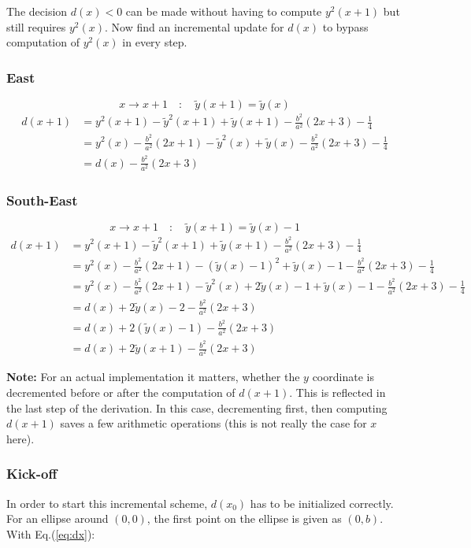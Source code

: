 \documentclass[12pt]{scrartcl}
\def\tyx{\widetilde{y}(x)}
\def\tyxp{\widetilde{y}(x+1)}
\def\yxs{y^2(x)}
\def\yxps{y^2(x+1)}
\def\tyxs{\widetilde{y}^2(x)}
\def\tyxps{\widetilde{y}^2(x+1)}
\def\fba{\frac{b^2}{a^2}}
\def\dx{d(x)}
\def\dxp{d(x+1)}
\def\fof{\frac{1}{4}}
\begin{document}
The decision $ \dx < 0 $ can be made without having to compute $\yxps$ 
but still requires $\yxs$. Now find an incremental update for $\dx$ to 
bypass computation of $\yxs$ in every step.

\subsubsection*{East}

$$ x \rightarrow x+1 \quad:\quad \tyxp = \tyx $$
\begin{align}
\dxp &= \yxps - \tyxps + \tyxp - \fba(2x+3) - \fof \nonumber \\
     &= \yxs - \fba(2x+1) - \tyxs + \tyx - \fba(2x+3) - \fof \nonumber \\
     &= \dx - \fba(2x+3)
\label{eq:dxe}
\end{align}

\subsubsection*{South-East}

$$ x \rightarrow x+1 \quad:\quad \tyxp = \tyx-1 $$
\begin{align}
\dxp &= \yxps - \tyxps + \tyxp - \fba(2x+3) - \fof \nonumber \\
     &= \yxs - \fba(2x+1) - (\tyx-1)^2 + \tyx - 1 - \fba(2x+3) - \fof \nonumber \\
     &= \yxs - \fba(2x+1) - \tyxs + 2\tyx - 1 + \tyx - 1 - \fba(2x+3) - \fof \nonumber \\
     &= \dx + 2\tyx - 2 - \fba(2x+3) \nonumber \\
     &= \dx + 2(\tyx - 1) - \fba(2x+3) \nonumber \\
     &= \dx + 2\tyxp - \fba(2x+3)
\label{eq:dxse}
\end{align}

\textbf{Note:} For an actual implementation it matters, whether the $y$
coordinate is decremented before or after the computation of $\dxp$.
This is reflected in the last step of the derivation. In this case, 
decrementing first, then computing $\dxp$ saves a few arithmetic 
operations (this is not really the case for $x$ here).

\subsubsection*{Kick-off}

In order to start this incremental scheme, $d(x_0)$ has to be 
initialized correctly. For an ellipse around $(0,0)$, the first point
on the ellipse is given as $(0,b)$. With Eq.(\ref{eq:dx}):
\end{document}
